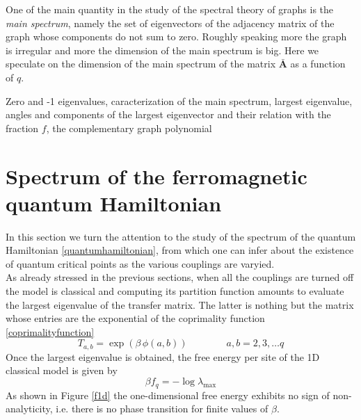 \documentclass[aps,pra,superscriptaddress]{revtex4}
\newcommand\be            {\begin{equation}}
\newcommand\ee            {\end{equation}}
\renewcommand{\(}{\left(}
\renewcommand{\)}{\right)}
\renewcommand{\[}{\left[}
\renewcommand{\]}{\right]}
\begin{document}
One of the main
quantity in the study of the spectral theory of graphs is the \textit{main spectrum}, namely the set of eigenvectors of the adjacency matrix of
the graph whose components do not
sum to zero. Roughly speaking more the graph is irregular and more the dimension of the main spectrum is big. Here we speculate on the dimension of the main spectrum of the
matrix $\mathbf{\bar{A}}$ as a function of $q$.


Zero and -1 eigenvalues, caracterization of the main spectrum, largest eigenvalue, angles and components of the largest eigenvector and their
relation with the fraction $f$, the complementary graph polynomial

\section{Spectrum of the ferromagnetic quantum Hamiltonian}
In this section we turn the attention to the study of the spectrum of the quantum Hamiltonian \eqref{quantumhamiltonian}, from which one can infer about the existence of quantum critical points as the various couplings are varyied.\\
As already stressed in the previous sections, when all the couplings are turned off the model is classical and computing its partition function amounts to evaluate the largest eigenvalue of the transfer matrix. The latter is nothing but the matrix whose entries are the exponential of the coprimality function \eqref{coprimalityfunction}
\be \label{transfermatrix}
T_{a,b} = \exp \( \beta \, \phi(a,b) \)
\qquad \qquad
a,b = 2,3,\dots q
\ee
Once the largest eigenvalue is obtained, the free energy per site of the 1D classical model is given by
\be 
\beta f_q = -  \log \lambda_\mathrm{max} 
\ee
As shown in Figure \ref{f1d} the one-dimensional free energy exhibits no sign of non-analyticity, i.e. there is no phase transition for finite values of $\beta$.
\end{document}
